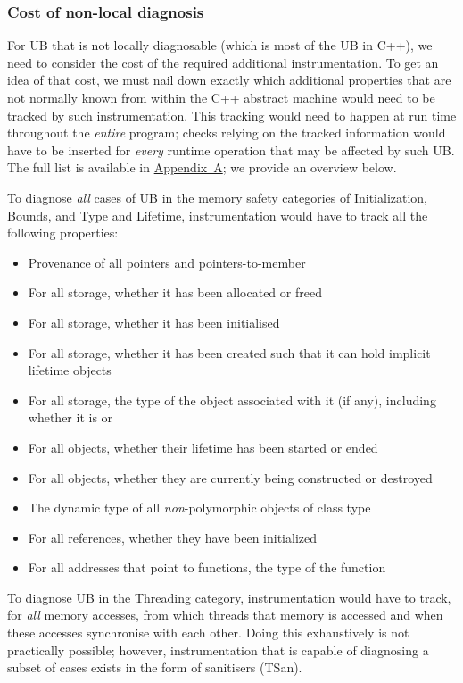 \subsubsection{Cost of non-local diagnosis}
\label{cost_nonlocal}

For UB that is not locally diagnosable (which is most of the UB in C++), we need to consider the cost of the required additional instrumentation. To get an idea of that cost, we must nail down exactly which additional properties that are not normally known from within the C++ abstract machine would need to be tracked by such instrumentation. This tracking would need to happen at run time throughout the \emph{entire} program; checks relying on the tracked information would have to be inserted for \emph{every} runtime operation that may be affected by such UB.
The full list is available in \hyperref[appendix]{Appendix~A}; we provide an overview below.

To diagnose \emph{all} cases of UB in the memory safety categories of Initialization, Bounds, and Type and Lifetime, instrumentation would have to track all the following properties:

\begin{itemize}
\item Provenance of all pointers and pointers-to-member
\item For all storage, whether it has been allocated or freed
\item For all storage, whether it has been initialised
\item For all storage, whether it has been created such that it can hold implicit lifetime objects
\item For all storage, the type of the object associated with it (if any), including whether it is  or 
\item For all objects, whether their lifetime has been started or ended
\item For all objects, whether they are currently being constructed or destroyed
\item The dynamic type of all \emph{non}-polymorphic objects of class type
\item For all references, whether they have been initialized
\item For all addresses that point to  functions, the type of the function
\end{itemize}

To diagnose UB in the Threading category, instrumentation would have to track, for \emph{all} memory accesses, from which threads that memory is accessed and when these accesses synchronise with each other. Doing this exhaustively is not practically possible; however, instrumentation that is capable of diagnosing a subset of cases exists in the form of sanitisers (TSan).

